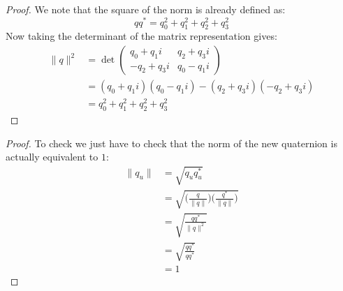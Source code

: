 \documentclass[12pt, letterpaper, onecolumn, conference, final]{IEEEtran}
\theoremstyle{definition}
\newtheorem{definition}{Definition}
\newtheorem{proposition}{Proposition}
\theoremstyle{plain}
\begin{document}
\begin{proof}
We note that the square of the norm is already defined as:
\begin{equation*}
qq^* = q_0^2 + q_1^2 + q_2^2 + q_3^2
\end{equation*}
Now taking the determinant of the matrix representation gives:
\begin{equation*}
\begin{split}
\| q \|^2 &= \det \begin{pmatrix}
q_0 + q_1i & q_2 + q_3i \\
-q_2 + q_3i & q_0 - q_1i
\end{pmatrix} \\
&= (q_0 + q_1i)(q_0 - q_1i) - (q_2 + q_3i)(-q_2 + q_3i) \\
&= q_0^2 + q_1^2 + q_2^2 + q_3^2
\end{split}
\end{equation*}
\end{proof}

\newpage
\begin{center}
\end{center}

\begin{center}
\end{center}

\begin{proof}
To check we just have to check that the norm of the new quaternion is actually equivalent to $1$:
\begin{equation*}
\begin{split}
\| q_u \| &= \sqrt{q_uq_u^*} \\
&= \sqrt{\Big( \frac{q}{\| q \|} \Big) \Big( \frac{q^*}{\| q \|} \Big)} \\
&= \sqrt{\frac{qq^*}{\| q \|^2}} \\
&= \sqrt{\frac{qq^*}{qq^*}} \\
&= 1
\end{split}
\end{equation*}
\end{proof}
\end{document}
